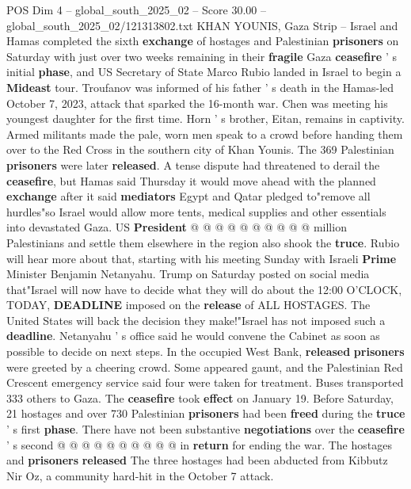 \begin{textsample}{POS Dim 4 – global\_south\_2025\_02 – Score 30.00 – global\_south\_2025\_02/121313802.txt}  \label{ex:f4_pos_030}
KHAN YOUNIS, Gaza Strip -- Israel and Hamas completed the sixth \textbf{exchange} of hostages and Palestinian \textbf{prisoners} on Saturday with just over two weeks remaining in their \textbf{fragile} Gaza \textbf{ceasefire} ' s initial \textbf{phase}, and US Secretary of State Marco Rubio landed in Israel to begin a \textbf{Mideast} tour.
Troufanov was informed of his father ' s death in the Hamas-led October 7, 2023, attack that sparked the 16-month war.
Chen was meeting his youngest daughter for the first time.
Horn ' s brother, Eitan, remains in captivity.
Armed militants made the pale, worn men speak to a crowd before handing them over to the Red Cross in the southern city of Khan Younis.
The 369 Palestinian \textbf{prisoners} were later \textbf{released}.
A tense dispute had threatened to derail the \textbf{ceasefire}, but Hamas said Thursday it would move ahead with the planned \textbf{exchange} after it said \textbf{mediators} Egypt and Qatar pledged to"remove all hurdles"so Israel would allow more tents, medical supplies and other essentials into devastated Gaza.
US \textbf{President} @ @ @ @ @ @ @ @ @ @ million Palestinians and settle them elsewhere in the region also shook the \textbf{truce}.
Rubio will hear more about that, starting with his meeting Sunday with Israeli \textbf{Prime} Minister Benjamin Netanyahu.
Trump on Saturday posted on social media that"Israel will now have to decide what they will do about the 12:00 O'CLOCK, TODAY, \textbf{DEADLINE} imposed on the \textbf{release} of ALL HOSTAGES.
The United States will back the decision they make!"Israel has not imposed such a \textbf{deadline}.
Netanyahu ' s office said he would convene the Cabinet as soon as possible to decide on next steps.
In the occupied West Bank, \textbf{released} \textbf{prisoners} were greeted by a cheering crowd.
Some appeared gaunt, and the Palestinian Red Crescent emergency service said four were taken for treatment.
Buses transported 333 others to Gaza.
The \textbf{ceasefire} took \textbf{effect} on January 19.
Before Saturday, 21 hostages and over 730 Palestinian \textbf{prisoners} had been \textbf{freed} during the \textbf{truce} ' s first \textbf{phase}.
There have not been substantive \textbf{negotiations} over the \textbf{ceasefire} ' s second @ @ @ @ @ @ @ @ @ @ in \textbf{return} for ending the war.
The hostages and \textbf{prisoners} \textbf{released} The three hostages had been abducted from Kibbutz Nir Oz, a community hard-hit in the October 7 attack.

\end{textsample}
